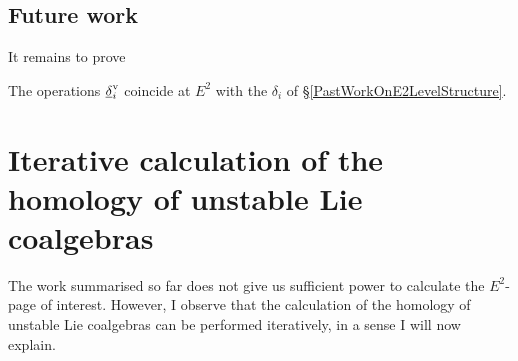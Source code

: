 \documentclass[11pt]{article}
\begin{document}
\subsection{Future work}
It remains to prove
\begin{conjecture}\label{vert-equals-koszul-n=1}
The operations $\underline{\delta}_i^\textup{v}$ coincide at $E^2$ with the $\delta_i$ of \S\ref{PastWorkOnE2LevelStructure}.
\end{conjecture}

\section{Iterative calculation of the homology of unstable Lie coalgebras}
The work summarised so far does not give us sufficient power to calculate the $E^2$-page of interest. However, I observe that the calculation of the homology of unstable Lie coalgebras can be performed iteratively, in a sense I will now explain.
\end{document}
